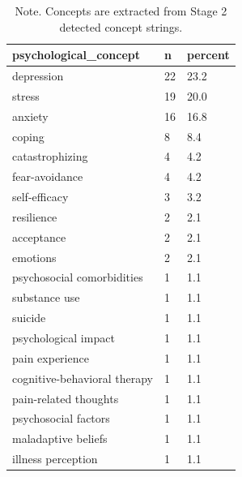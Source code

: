 \begin{table}[htbp]
\raggedright
\caption{Primary Research Question 3. Most frequent psychological concepts.}
\label{tab.psych.concepts}
\begin{tabular}{lll}
\toprule
psychological\_concept & n & percent \\
\midrule
depression & 22 & 23.2 \\
stress & 19 & 20.0 \\
anxiety & 16 & 16.8 \\
coping & 8 & 8.4 \\
catastrophizing & 4 & 4.2 \\
fear-avoidance & 4 & 4.2 \\
self-efficacy & 3 & 3.2 \\
resilience & 2 & 2.1 \\
acceptance & 2 & 2.1 \\
emotions & 2 & 2.1 \\
psychosocial comorbidities & 1 & 1.1 \\
substance use & 1 & 1.1 \\
suicide & 1 & 1.1 \\
psychological impact & 1 & 1.1 \\
pain experience & 1 & 1.1 \\
cognitive-behavioral therapy & 1 & 1.1 \\
pain-related thoughts & 1 & 1.1 \\
psychosocial factors & 1 & 1.1 \\
maladaptive beliefs & 1 & 1.1 \\
illness perception & 1 & 1.1 \\
\bottomrule
\end{tabular}

\caption*{Note. Concepts are extracted from Stage 2 detected concept strings.}
\end{table}
